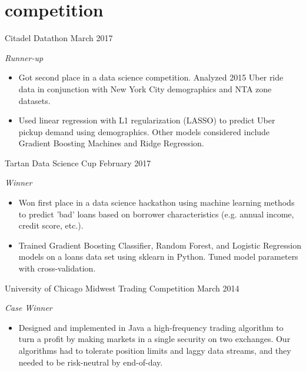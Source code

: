 \documentclass[print]{friggeri-cv} %
\begin{document}
\begin{entrylist}
\end{entrylist}


\section{competition}

\begin{entrylist}
\entry
{Citadel Datathon}
{March 2017}
{\emph{Runner-up}
\begin{itemize}
\item Got second place in a data science competition. Analyzed 2015 Uber ride data in conjunction with New York City demographics and NTA zone datasets. 
\item Used linear regression with L1 regularization (LASSO) to predict Uber pickup demand using demographics. Other models considered include Gradient Boosting Machines and Ridge Regression. 
\end{itemize}}
\entry
{Tartan Data Science Cup}
{February 2017}
{\emph{Winner}
\begin{itemize}
\item Won first place in a data science hackathon using machine learning methods to predict 'bad' loans based on borrower characteristics (e.g. annual income, credit score, etc.).
\item Trained Gradient Boosting Classifier, Random Forest, and Logistic Regression models on a loans data set using sklearn in Python. Tuned model parameters with cross-validation. 
\end{itemize}}
\entry
{University of Chicago Midwest Trading Competition}
{March 2014}
{\emph{Case Winner}
\begin{itemize}
\item Designed and implemented in Java a high-frequency trading algorithm to turn a profit by making markets in a single security on two exchanges. Our algorithms had to tolerate position limits and laggy data streams, and they needed to be risk-neutral by end-of-day.
\end{itemize}}
\end{entrylist}
\end{document}
